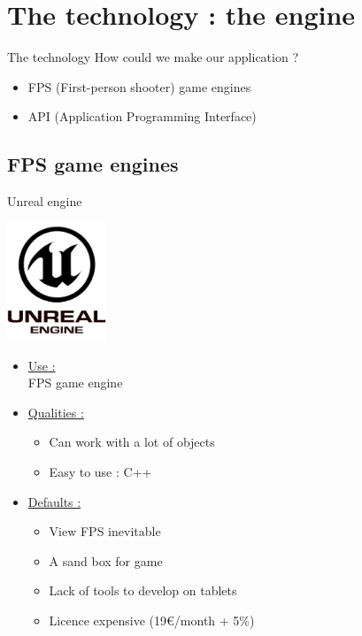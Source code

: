 \documentclass[a4paper,10pt]{beamer}
\begin{document}
		
		
	\section{The technology : the engine}
			
			\begin{frame}{The technology}
				How could we make our application ?
				\begin{itemize}
					\item FPS (First-person shooter) game engines
					\item API (Application Programming Interface)

				\end{itemize}
			\end{frame}
			
		\subsection{FPS game engines}
		
			\begin{frame}{Unreal engine}
				\begin{multicols}{2}
				\includegraphics[height=100pt]{images/logos/Unreal_Engine.png}\\
				
				\columnbreak 
				
				 \begin{itemize}
				 	\item \underline{Use :}\\		
					 FPS game engine	 
					 \item \underline{Qualities :}\\
						 \begin{itemize}
						 	\item Can work with a lot of objects
						 	\item Easy to use : C++
						 \end{itemize}
				 \end{itemize}		 
				\end{multicols}
				\begin{itemize}
					\item \underline{Defaults :}\\
					\begin{itemize}
						\item View FPS inevitable
						\item A sand box for game
						\item Lack of tools to develop on tablets
						\item Licence expensive (19\euro/month + 5\%)
					\end{itemize}
				\end{itemize}
			\end{frame}
			
\end{document}
